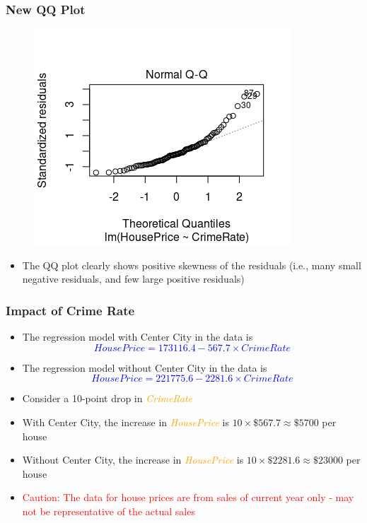\documentclass[10pt]{beamer}
\theoremstyle{plain}
\begin{document}
\begin{frame}
\frametitle{\sc New QQ Plot}
    \begin{figure}[!ht]
		\centering
		\includegraphics[scale=0.7]{figs8/QQ-new.png}
	\end{figure}
\begin{itemize}
\item The QQ plot clearly shows positive skewness of the residuals (i.e., many small negative residuals, and few large positive residuals)
\end{itemize}
\end{frame}

\begin{frame}
	\frametitle{\sc Impact of Crime Rate}
	\begin{itemize}
		\item The regression model with Center City in the data is
		\textcolor{blue}{\[
		House Price = 173116.4 - 567.7 \times Crime Rate
		\]}
		\item The regression model without Center City in the data is
		\textcolor{blue}{\[
		House Price = 221775.6 - 2281.6 \times Crime Rate
		\]}
		\item Consider a 10-point drop in \textcolor{orange}{\textit{CrimeRate}}
		\item With Center City, the increase in \textcolor{orange}{\textit{HousePrice}} is $10 \times \$567.7 \approx \$5700$ per house
		\item Without Center City, the increase in \textcolor{orange}{\textit{HousePrice}} is $10 \times \$2281.6 \approx \$23000$ per house
		\item \textcolor{red}{Caution: The data for house prices are from sales of current year only - may not be representative of the actual sales}
	\end{itemize}
\end{frame}
\end{document}
